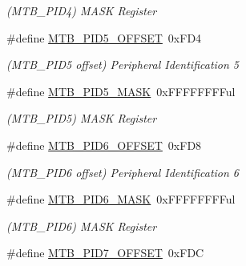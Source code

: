 \begin{DoxyCompactItemize}
\begin{DoxyCompactList}\small\item\em (M\+T\+B\+\_\+\+P\+I\+D4) M\+A\+S\+K Register \end{DoxyCompactList}\item 
\hypertarget{group___s_a_m_l21___m_t_b_gaa963a280721b3e1007d6e36bb3d5d522}{}\#define \hyperlink{group___s_a_m_l21___m_t_b_gaa963a280721b3e1007d6e36bb3d5d522}{M\+T\+B\+\_\+\+P\+I\+D5\+\_\+\+O\+F\+F\+S\+E\+T}~0x\+F\+D4\label{group___s_a_m_l21___m_t_b_gaa963a280721b3e1007d6e36bb3d5d522}

\begin{DoxyCompactList}\small\item\em (M\+T\+B\+\_\+\+P\+I\+D5 offset) Peripheral Identification 5 \end{DoxyCompactList}\item 
\hypertarget{group___s_a_m_l21___m_t_b_ga31b4cd998c91073723497dab877ea316}{}\#define \hyperlink{group___s_a_m_l21___m_t_b_ga31b4cd998c91073723497dab877ea316}{M\+T\+B\+\_\+\+P\+I\+D5\+\_\+\+M\+A\+S\+K}~0x\+F\+F\+F\+F\+F\+F\+F\+Ful\label{group___s_a_m_l21___m_t_b_ga31b4cd998c91073723497dab877ea316}

\begin{DoxyCompactList}\small\item\em (M\+T\+B\+\_\+\+P\+I\+D5) M\+A\+S\+K Register \end{DoxyCompactList}\item 
\hypertarget{group___s_a_m_l21___m_t_b_gae61271ff24ec3878348f10678f1d271b}{}\#define \hyperlink{group___s_a_m_l21___m_t_b_gae61271ff24ec3878348f10678f1d271b}{M\+T\+B\+\_\+\+P\+I\+D6\+\_\+\+O\+F\+F\+S\+E\+T}~0x\+F\+D8\label{group___s_a_m_l21___m_t_b_gae61271ff24ec3878348f10678f1d271b}

\begin{DoxyCompactList}\small\item\em (M\+T\+B\+\_\+\+P\+I\+D6 offset) Peripheral Identification 6 \end{DoxyCompactList}\item 
\hypertarget{group___s_a_m_l21___m_t_b_gacb630031f7b28faf52c8f6bf82da6b16}{}\#define \hyperlink{group___s_a_m_l21___m_t_b_gacb630031f7b28faf52c8f6bf82da6b16}{M\+T\+B\+\_\+\+P\+I\+D6\+\_\+\+M\+A\+S\+K}~0x\+F\+F\+F\+F\+F\+F\+F\+Ful\label{group___s_a_m_l21___m_t_b_gacb630031f7b28faf52c8f6bf82da6b16}

\begin{DoxyCompactList}\small\item\em (M\+T\+B\+\_\+\+P\+I\+D6) M\+A\+S\+K Register \end{DoxyCompactList}\item 
\hypertarget{group___s_a_m_l21___m_t_b_ga1fc275c8eb95588a8087dddf88ce0fd1}{}\#define \hyperlink{group___s_a_m_l21___m_t_b_ga1fc275c8eb95588a8087dddf88ce0fd1}{M\+T\+B\+\_\+\+P\+I\+D7\+\_\+\+O\+F\+F\+S\+E\+T}~0x\+F\+D\+C\label{group___s_a_m_l21___m_t_b_ga1fc275c8eb95588a8087dddf88ce0fd1}


\end{DoxyCompactItemize}
